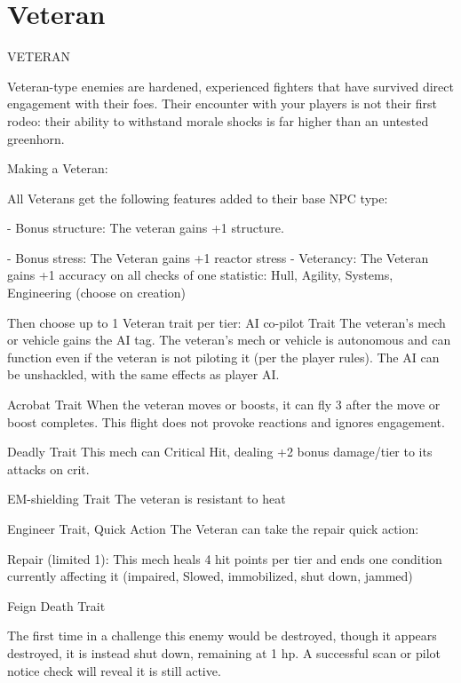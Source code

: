 \section{Veteran}
                                                   VETERAN  

Veteran-type enemies are hardened, experienced fighters that have survived direct engagement  
with their foes. Their encounter with your players is not their first rodeo: their ability to withstand  
morale shocks is far higher than an untested greenhorn.
 

Making a Veteran:
 
All Veterans get the following features added to their base NPC type:
 
     -   Bonus structure: The veteran gains +1 structure.
 
     -   Bonus stress: The Veteran gains +1 reactor stress  
     -   Veterancy: The Veteran gains +1 accuracy on all checks of one statistic: Hull, Agility,  
         Systems, Engineering (choose on creation)  

Then choose up to 1 Veteran trait per tier:  
AI co-pilot  
Trait  
The veteran’s mech or vehicle gains the AI tag. The veteran’s mech or vehicle is autonomous and  
can function even if the veteran is not piloting it (per the player rules). The AI can be unshackled,  
with the same effects as player AI.
 

Acrobat  
Trait  
When the veteran moves or boosts, it can fly 3 after the move or boost completes. This flight  
does not provoke reactions and ignores engagement.
 

Deadly  
Trait  
This mech can Critical Hit, dealing +2 bonus damage/tier to its attacks on crit.
 

EM-shielding  
Trait  
The veteran is resistant to heat
 

Engineer  
Trait, Quick Action  
The Veteran can take the repair quick action:
 
         Repair (limited 1): This mech heals 4 hit points per tier and ends one condition currently  
         affecting it (impaired, Slowed, immobilized, shut down, jammed)
 

Feign Death  
Trait  

                                                                                                                  


The first time in a challenge this enemy would be destroyed, though it appears destroyed, it is  
instead shut down, remaining at 1 hp. A successful scan or pilot notice check will reveal it is still  
active.
 

